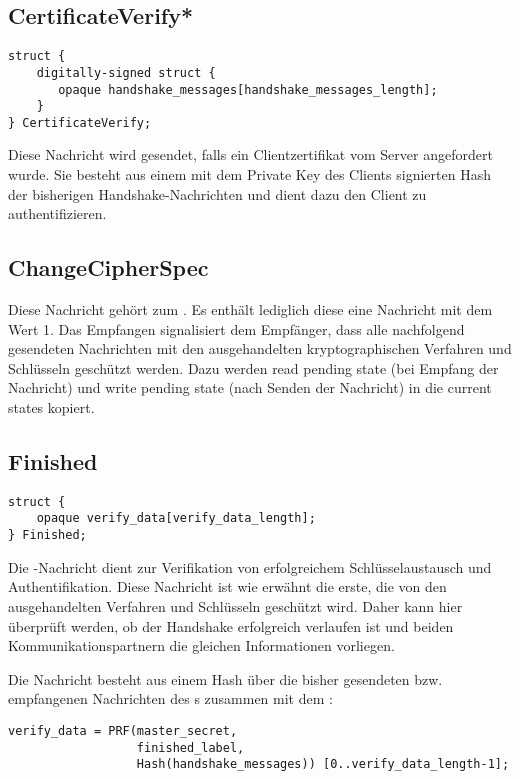 \subsection*{CertificateVerify*}

\begin{lstlisting}
struct {
	digitally-signed struct {
	   opaque handshake_messages[handshake_messages_length];
	}
} CertificateVerify;
\end{lstlisting}

Diese Nachricht wird gesendet, falls ein Clientzertifikat vom Server angefordert wurde. Sie besteht aus einem mit dem Private Key des Clients signierten Hash der bisherigen Handshake-Nachrichten und dient dazu den Client zu authentifizieren.

\subsection*{ChangeCipherSpec}

Diese Nachricht gehört zum \changecipherspecprotocol{}. Es enthält lediglich diese eine Nachricht mit dem Wert 1. Das Empfangen signalisiert dem Empfänger, dass alle nachfolgend gesendeten Nachrichten mit den ausgehandelten kryptographischen Verfahren und Schlüsseln geschützt werden. Dazu werden read pending state (bei Empfang der Nachricht) und write pending state (nach Senden der Nachricht) in die current states kopiert.

\subsection*{Finished}

\begin{lstlisting}
struct {
	opaque verify_data[verify_data_length];
} Finished;
\end{lstlisting}

Die \finished{}-Nachricht dient zur Verifikation von erfolgreichem Schlüsselaustausch und Authentifikation. Diese Nachricht ist wie erwähnt die erste, die von den ausgehandelten Verfahren und Schlüsseln geschützt wird. Daher kann hier überprüft werden, ob der Handshake erfolgreich verlaufen ist und beiden Kommunikationspartnern die gleichen Informationen vorliegen.

Die Nachricht besteht aus einem Hash über die bisher gesendeten bzw. empfangenen Nachrichten des \handshakeprotocol{}s zusammen mit dem \mastersecret{}:

\begin{lstlisting}
verify_data = PRF(master_secret, 
				  finished_label, 
				  Hash(handshake_messages)) [0..verify_data_length-1];
\end{lstlisting}

